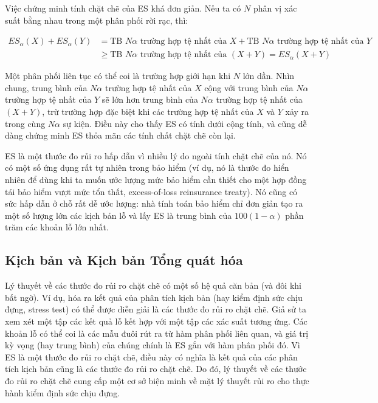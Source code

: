Việc chứng minh tính chặt chẽ của ES khá đơn giản. Nếu ta có $N$ phân vị xác suất bằng nhau trong một phân phối rời rạc, thì:

\begin{align*}
ES_\alpha(X) + ES_\alpha(Y) &= \text{TB } N\alpha \text{ trường hợp tệ nhất của } X + \text{TB } N\alpha \text{ trường hợp tệ nhất của } Y \\
&\geq \text{TB } N\alpha \text{ trường hợp tệ nhất của } (X+Y) = ES_\alpha(X+Y) \tag{4}
\end{align*}

Một phân phối liên tục có thể coi là trường hợp giới hạn khi $N$ lớn dần. Nhìn chung, trung bình của $N\alpha$ trường hợp tệ nhất của $X$ cộng với trung bình của $N\alpha$ trường hợp tệ nhất của $Y$ sẽ lớn hơn trung bình của $N\alpha$ trường hợp tệ nhất của $(X+Y)$, trừ trường hợp đặc biệt khi các trường hợp tệ nhất của $X$ và $Y$ xảy ra trong cùng $N\alpha$ sự kiện. Điều này cho thấy ES có tính dưới cộng tính, và cũng dễ dàng chứng minh ES thỏa mãn các tính chất chặt chẽ còn lại.

ES là một thước đo rủi ro hấp dẫn vì nhiều lý do ngoài tính chặt chẽ của nó. Nó có một số ứng dụng rất tự nhiên trong bảo hiểm (ví dụ, nó là thước đo hiển nhiên để dùng khi ta muốn ước lượng mức bảo hiểm cần thiết cho một hợp đồng tái bảo hiểm vượt mức tổn thất, excess-of-loss reinsurance treaty). Nó cũng có sức hấp dẫn ở chỗ rất dễ ước lượng: nhà tính toán bảo hiểm chỉ đơn giản tạo ra một số lượng lớn các kịch bản lỗ và lấy ES là trung bình của $100(1-\alpha)$ phần trăm các khoản lỗ lớn nhất.

\subsection{Kịch bản và Kịch bản Tổng quát hóa}

Lý thuyết về các thước đo rủi ro chặt chẽ có một số hệ quả căn bản (và đôi khi bất ngờ). Ví dụ, hóa ra kết quả của phân tích kịch bản (hay kiểm định sức chịu đựng, stress test) có thể được diễn giải là các thước đo rủi ro chặt chẽ. Giả sử ta xem xét một tập các kết quả lỗ kết hợp với một tập các xác suất tương ứng. Các khoản lỗ có thể coi là các mẫu đuôi rút ra từ hàm phân phối liên quan, và giá trị kỳ vọng (hay trung bình) của chúng chính là ES gắn với hàm phân phối đó. Vì ES là một thước đo rủi ro chặt chẽ, điều này có nghĩa là kết quả của các phân tích kịch bản cũng là các thước đo rủi ro chặt chẽ. Do đó, lý thuyết về các thước đo rủi ro chặt chẽ cung cấp một cơ sở biện minh về mặt lý thuyết rủi ro cho thực hành kiểm định sức chịu đựng.

